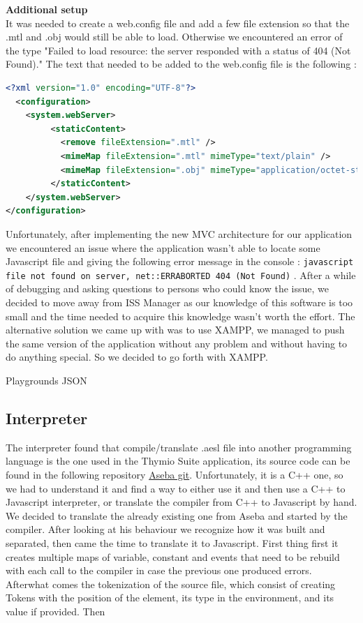 \documentclass{scrartcl}
\begin{document}
\textbf{Additional setup}\\

It was needed to create a web.config file and add a few file extension so that the .mtl and .obj would still be able to load. 
Otherwise we encountered an error of the type "Failed to load resource: the server responded with a status of 404 (Not Found)." 
The text that needed to be added to the web.config file is the following : \\
\begin{lstlisting}[language=XML, basicstyle=\ttfamily\small]
<?xml version="1.0" encoding="UTF-8"?>
  <configuration>
    <system.webServer>
         <staticContent>
           <remove fileExtension=".mtl" />
           <mimeMap fileExtension=".mtl" mimeType="text/plain" />
           <mimeMap fileExtension=".obj" mimeType="application/octet-stream" />
         </staticContent>
    </system.webServer>
</configuration>
\end{lstlisting}

Unfortunately, after implementing the new MVC architecture for our application we encountered an issue where the application wasn't able to locate some Javascript file and giving the following error message in the console : 
\texttt{javascript file not found on server, net::ERR\textunderscore ABORTED 404 (Not Found)} .  After a while of debugging and asking questions to persons who could know the issue, 
we decided to move away from ISS Manager as our knowledge of this software is too small and the time needed to acquire this knowledge wasn't worth the effort. 
The alternative solution we came up with was to use XAMPP, we managed to push the same version of the application without any problem and without having to do anything special. So we decided to go forth with XAMPP.

Playgrounds 
JSON
\subsection{Interpreter}
The interpreter found that compile/translate .aesl file into another programming language is the one used in the Thymio Suite application, its source code can be found in the following repository \href{https://github.com/aseba-community/aseba/tree/master/aseba/compiler}{Aseba git}.
Unfortunately, it is a C++ one, so we had to understand it and find a way to either use it and then use a C++ to Javascript interpreter, or translate the compiler from C++ to Javascript by hand.
We decided to translate the already existing one from Aseba and started by the compiler. After looking at his behaviour we recognize how it was built and separated,
then came the time to translate it to Javascript. First thing first it creates multiple maps of variable, constant and events that need to be rebuild with each call to the compiler in case the previous one produced errors.
Afterwhat comes the tokenization of the source file, which consist of creating Tokens with the position of the element, its type in the environment, and its value if provided.
Then 
\end{document}
